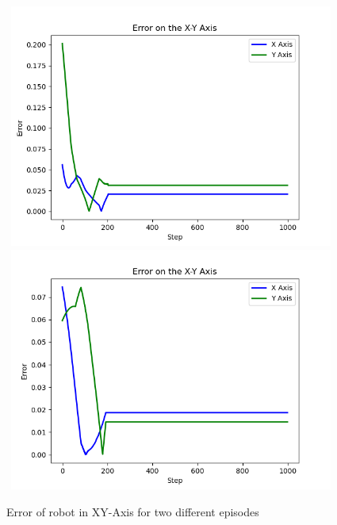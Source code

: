 \documentclass[12pt,twoside,a4]{mwbk}
\begin{document}
\begin{figure}[h!]
    \centering
    \includegraphics[width=11cm, height=8cm]{error_test_x_y.png}
    \includegraphics[width=11cm, height=8cm]{error_test_x_y_2.png}
    \caption{Error of robot in XY-Axis for two different episodes}
\end{figure}
\end{document}
